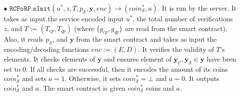 \begin{definition}
\begin{itemize}
\


\item[$\bullet$] $\mathtt{RCPoRP}.\mathtt{sInit}(u^{\scriptscriptstyle *},z, T, p_{\scriptscriptstyle\mathcal S},\bm{y},enc)\rightarrow (coin^{\scriptscriptstyle *}_{\scriptscriptstyle\mathcal S},a)$. It is  run by the server. It takes as input the  service encoded input $u^{\scriptscriptstyle *}$, the total number of verifications $z$, and $T:=(T_{\scriptscriptstyle cp},T_{\scriptscriptstyle qp})$ (where $\{g_{\scriptscriptstyle cp},  g_{\scriptscriptstyle qp}\}$ are read from the smart contract). Also, it reads $p_{\scriptscriptstyle\mathcal S}$, and $\bm{y}$ from the smart contract and takes as input the encoding/decoding functions $enc:=(E,D)$. It verifies the validity of $T$'s elements. It checks elements of $\bm{y}$ and ensures element of $\bm{y}_{\scriptscriptstyle \mathcal  C}, \bm{y}_{\scriptscriptstyle \mathcal  S}\in \bm{y}$ have been set to $0$. If all checks are successful, then it encodes the amount of its coins  $coin^{\scriptscriptstyle*}_{\scriptscriptstyle\mathcal S}$ and sets $a=1$. Otherwise, it sets $coin^{\scriptscriptstyle *}_{\scriptscriptstyle\mathcal S}=\bot$ and $a=0$. It outputs $coin^{\scriptscriptstyle *}_{\scriptscriptstyle\mathcal S}$ and $a$. The smart contract is given $coin^{\scriptscriptstyle *}_{\scriptscriptstyle\mathcal S}$ coins and $a$.  





\end{itemize}
\end{definition}
